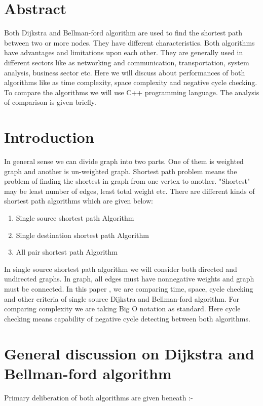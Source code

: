 \documentclass[a4paper,10pt]{article}
\begin{document}
\begin{multicols}{2}

\section{Abstract}
Both Dijkstra and Bellman-ford algorithm are used to find the shortest path between two or more nodes. They have different characteristics. Both algorithms have advantages and limitations upon each other. They are generally used in different sectors like as networking and communication, transportation, system analysis, business sector etc. Here we will discuss about performances of both algorithms like as time complexity, space complexity and negative cycle checking. To compare the algorithms we will use C++ programming language. The analysis of comparison is given briefly.

\section{Introduction}
In general sense we can divide graph into two parts. One of them is weighted graph and another is un-weighted graph.
Shortest path problem means the problem of finding the shortest in graph from one vertex to another. "Shortest" may be least number of edges, least total weight etc. There are different kinds of shortest path algorithms which are given below:
\begin{enumerate}
  \item Single source shortest path Algorithm
  \item Single destination shortest path Algorithm
  \item All pair shortest path Algorithm
\end{enumerate}
In single source shortest path algorithm we will consider both directed and undirected graphs. In graph, all edges must have nonnegative weights and graph must be connected. In this paper , we are comparing time, space, cycle checking and other criteria of single source Dijkstra and Bellman-ford algorithm. For comparing complexity we are taking Big O notation as standard. Here cycle checking means capability of negative cycle detecting between both algorithms.


\section{General discussion on Dijkstra and Bellman-ford algorithm}
Primary deliberation of both algorithms are given beneath :-\

\end{multicols}
\end{document}
